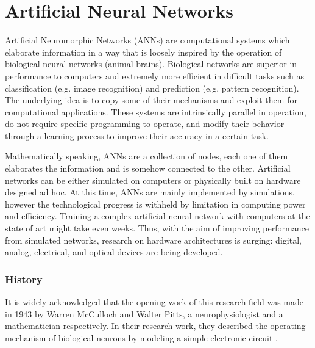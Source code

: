 \chapter{Artificial Neural Networks}
\label{ch:Artificial_Neural_Networks}


Artificial Neuromorphic Networks (ANNs) are computational systems which elaborate information in a way that is loosely inspired by the operation of biological neural networks (animal brains).
Biological networks are superior in performance to computers and extremely more efficient in difficult tasks such as classification (e.g. image recognition) and prediction (e.g. pattern recognition).
The underlying idea is to copy some of their mechanisms and exploit them for computational applications.
These systems are intrinsically parallel in operation, do not require specific programming to operate, and modify their behavior through a learning process to improve their accuracy in a certain task.

Mathematically speaking, ANNs are a collection of nodes, each one of them elaborates the information and is somehow connected to the other.
Artificial networks can be either simulated on computers or physically built on hardware designed ad hoc.
At this time, ANNs are mainly implemented by simulations, however the technological progress is withheld by limitation in computing power and efficiency.
Training a complex artificial neural network with computers at the state of art might take even weeks.
Thus, with the aim of improving performance from simulated networks, research on hardware architectures is surging: digital, analog, electrical, and optical devices are being developed.

\subsection{History}
\label{ssec:History}
It is widely acknowledged that the opening work of this research field was made in 1943 by Warren McCulloch and Walter Pitts, a neurophysiologist and a mathematician respectively.
In their research work, they described the operating mechanism of biological neurons by modeling a simple electronic circuit \cite{McCulloch1943}.

